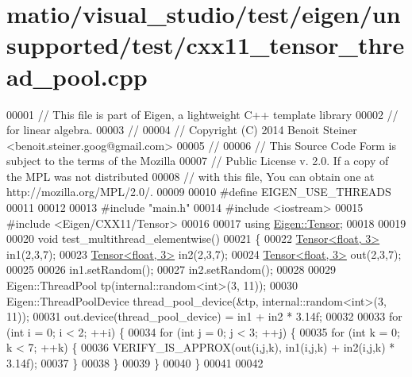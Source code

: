 \hypertarget{matio_2visual__studio_2test_2eigen_2unsupported_2test_2cxx11__tensor__thread__pool_8cpp_source}{}\section{matio/visual\+\_\+studio/test/eigen/unsupported/test/cxx11\+\_\+tensor\+\_\+thread\+\_\+pool.cpp}
\label{matio_2visual__studio_2test_2eigen_2unsupported_2test_2cxx11__tensor__thread__pool_8cpp_source}

\begin{DoxyCode}
00001 \textcolor{comment}{// This file is part of Eigen, a lightweight C++ template library}
00002 \textcolor{comment}{// for linear algebra.}
00003 \textcolor{comment}{//}
00004 \textcolor{comment}{// Copyright (C) 2014 Benoit Steiner <benoit.steiner.goog@gmail.com>}
00005 \textcolor{comment}{//}
00006 \textcolor{comment}{// This Source Code Form is subject to the terms of the Mozilla}
00007 \textcolor{comment}{// Public License v. 2.0. If a copy of the MPL was not distributed}
00008 \textcolor{comment}{// with this file, You can obtain one at http://mozilla.org/MPL/2.0/.}
00009 
00010 \textcolor{preprocessor}{#define EIGEN\_USE\_THREADS}
00011 
00012 
00013 \textcolor{preprocessor}{#include "main.h"}
00014 \textcolor{preprocessor}{#include <iostream>}
00015 \textcolor{preprocessor}{#include <Eigen/CXX11/Tensor>}
00016 
00017 \textcolor{keyword}{using} \hyperlink{class_eigen_1_1_tensor}{Eigen::Tensor};
00018 
00019 
00020 \textcolor{keywordtype}{void} test\_multithread\_elementwise()
00021 \{
00022   \hyperlink{class_eigen_1_1_tensor}{Tensor<float, 3>} in1(2,3,7);
00023   \hyperlink{class_eigen_1_1_tensor}{Tensor<float, 3>} in2(2,3,7);
00024   \hyperlink{class_eigen_1_1_tensor}{Tensor<float, 3>} out(2,3,7);
00025 
00026   in1.setRandom();
00027   in2.setRandom();
00028 
00029   Eigen::ThreadPool tp(internal::random<int>(3, 11));
00030   Eigen::ThreadPoolDevice thread\_pool\_device(&tp, internal::random<int>(3, 11));
00031   out.device(thread\_pool\_device) = in1 + in2 * 3.14f;
00032 
00033   \textcolor{keywordflow}{for} (\textcolor{keywordtype}{int} i = 0; i < 2; ++i) \{
00034     \textcolor{keywordflow}{for} (\textcolor{keywordtype}{int} j = 0; j < 3; ++j) \{
00035       \textcolor{keywordflow}{for} (\textcolor{keywordtype}{int} k = 0; k < 7; ++k) \{
00036         VERIFY\_IS\_APPROX(out(i,j,k), in1(i,j,k) + in2(i,j,k) * 3.14f);
00037       \}
00038     \}
00039   \}
00040 \}
00041 
00042 

\end{DoxyCode}
